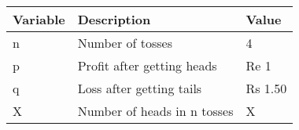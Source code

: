 \begin{tabular}{|l|l|l|}\hline
Variable	&Description	&Value\\\hline
n	&Number of tosses	&4\\\hline
p	&Profit after getting heads	&Re 1\\\hline
q	&Loss after getting tails	&Rs 1.50\\\hline
X	&Number of heads in n tosses	&X\\\hline
\end{tabular}
